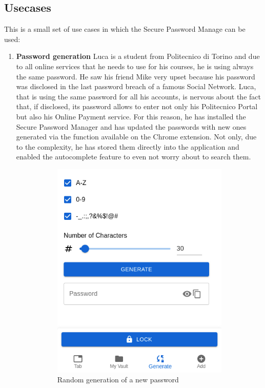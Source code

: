 \subsection{Usecases}
This is a small set of use cases in which the Secure Password Manage can be used:
\begin{enumerate}
	\item \textbf{Password generation}
	Luca is a student from Politecnico di Torino and due to all online services that he needs to use for his courses, he is using always the same password. He saw his friend Mike very upset because his password was disclosed in the last password breach of a famous Social Network. Luca, that is using the same password for all his accounts, is nervous about the fact that, if disclosed, its password allows to enter not only his Politecnico Portal but also his Online Payment service.\newline
	For this reason, he has installed the Secure Password Manager and has updated the passwords with new ones generated via the function available on the Chrome extension. Not only, due to the complexity, he has stored them directly into the application and enabled the autocomplete feature to even not worry about to search them.
	\begin{figure}[H]
		\centering
		\begin{subfigure}{.5\textwidth}
			\centering
			\includegraphics[width=.6\linewidth]{images/extension/generate.png}
			\caption{Random generation of a new password}
			\label{fig:sub1}
		\end{subfigure}%
		\begin{subfigure}{.5\textwidth}

\end{subfigure}
\end{figure}
\end{enumerate}
